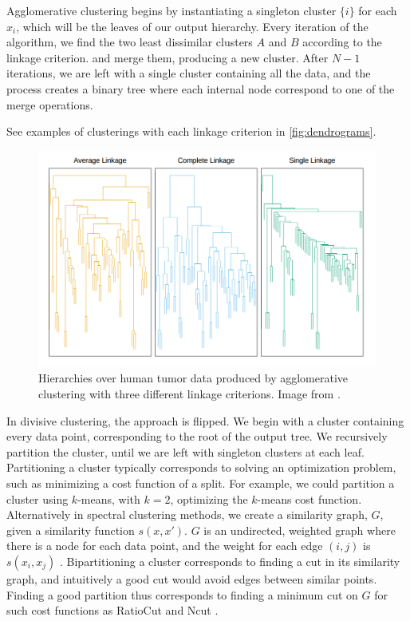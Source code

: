Agglomerative clustering begins by instantiating
a singleton cluster $\{i\}$ for each $x_i$, which
will be the leaves of our output hierarchy.
Every iteration of the algorithm, 
we find
the two least dissimilar clusters $A$ and $B$
according to the linkage criterion.
and merge them, producing a new cluster.
After $N - 1$ iterations, we are left
with a single cluster containing
all the data, and the process
creates a binary tree where each internal node
correspond to one of the merge operations.

See examples of clusterings with each
linkage criterion
in \autoref{fig:dendrograms}.


\begin{figure}[t]
  \includegraphics[width=\textwidth]{img/trees/dendrograms}
  \caption{Hierarchies over human tumor data produced by agglomerative clustering
    with three different linkage criterions. 
  Image from \citet{Hastie2009}.}
\label{fig:dendrograms}
\end{figure}

In divisive clustering, the approach is flipped.
We begin with a cluster containing
every data point, corresponding
to the root of the output tree.
We recursively
partition the cluster, until 
we are left with singleton clusters
at each leaf.
Partitioning a cluster
typically corresponds to solving
an optimization problem, such as minimizing
a cost function of a split.
For example, we could partition
a cluster using $k$-means, with $k = 2$,
optimizing the $k$-means cost function.
Alternatively in spectral clustering methods,
we create a similarity graph, $G$,
given a similarity function $s(x, x')$.
$G$ is an undirected, weighted graph
where there is a node for each data point,
and the weight for each edge $(i, j)$ is
$s(x_i, x_j)$ \citep{VonLuxburg2007}.
Bipartitioning a cluster
corresponds to finding a cut in its similarity graph,
and intuitively a good cut would avoid
edges between similar points.
Finding a good partition thus corresponds
to finding a minimum cut on $G$
for such cost functions as
RatioCut \citep{Hagen1992} and Ncut \citep{Shi2000}.

